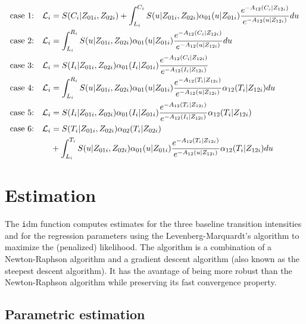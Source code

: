 \documentclass{article}
\newcommand{\code}[1]{{\texttt #1}}
\begin{document}
\begin{equation}\label{eq:1}
 \begin{split}
 \text{case 1:}\quad {\cal L}_i & = S(C_i|Z_{01i},Z_{02i}) + \int_{L_i}^{C_i} S(u|Z_{01i},Z_{02i}) \alpha_{01}(u|Z_{01i}) \frac{e^{-{A}_{12}(C_i|Z_{12i})}}{e^{-{A}_{12}(u|Z_{12i})}}du \\
 \text{case 2:}\quad {\cal L}_i & = \int_{L_i} ^{R_i} S(u|Z_{01i},Z_{02i}) \alpha_{01}(u|Z_{01i}) \frac{e^{-{A}_{12}(C_i|Z_{12i})}}{e^{-{A}_{12}(u|Z_{12i})}}du\\
 \text{case 3:}\quad {\cal L}_i & =  S(I_i|Z_{01i},Z_{02i}) \alpha_{01}(I_i|Z_{01i}) \frac{e^{-{A}_{12}(C_i|Z_{12i})}}{e^{-{A}_{12}(I_i|Z_{12i})}}\\
 \text{case 4:}\quad {\cal L}_i & = \int_{L_i} ^{R_i} S(u|Z_{01i},Z_{02i}) \alpha_{01}(u|Z_{01i}) \frac{e^{-{A}_{12}(T_i|Z_{12i})}}{e^{-{A}_{12}(u|Z_{12i})}} \alpha_{12}(T_i|Z_{12i})du\\
 \text{case 5:}\quad  {\cal L}_i & =  S(I_i|Z_{01i},Z_{02i}) \alpha_{01}(I_i|Z_{01i}) \frac{e^{-{A}_{12}(T_i|Z_{12i})}}{e^{-{A}_{12}(I_i|Z_{12i})}} \alpha_{12}(T_i|Z_{12i})\\ 
 \text{case 6:}\quad {\cal L}_i & = S(T_i|Z_{01i},Z_{02i})\alpha_{02}(T_i|Z_{02i}) \\
  \qquad & + \int_{L_i}^{T_i} S(u|Z_{01i},Z_{02i}) \alpha_{01}(u|Z_{01i}) \frac{e^{-{A}_{12}(T_i|Z_{12i})}}{e^{-{A}_{12}(u|Z_{12i})}} \alpha_{12}(T_i|Z_{12i}) du \\
 \end{split}
 \end{equation}
\section{Estimation}
\label{sec-3}

The \code{idm} function computes estimates for the three baseline
transition intensities and for the regression parameters using the
Levenberg-Marquardt's algorithm \citep{Levenberg_1944,Marquardt_1963}
to maximize the (penalized) likelihood.  The algorithm is a
combination of a Newton-Raphson algorithm and a gradient descent
algorithm (also known as the steepest descent algorithm). It has the
avantage of being more robust than the Newton-Raphson algorithm while
preserving its fast convergence property.

\subsection{Parametric estimation}
\label{sec-3-1}
\end{document}
